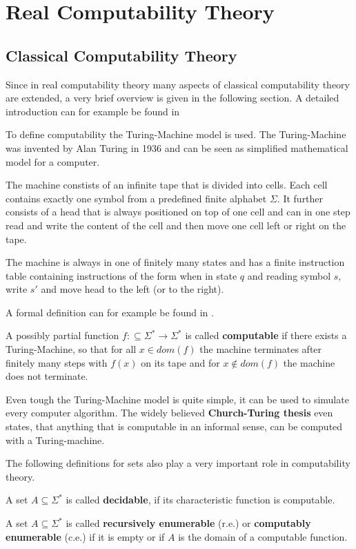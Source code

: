 \section{Real Computability Theory}\label{sec:real computability}
\subsection{Classical Computability Theory}
 Since in real computability theory many aspects of classical computability theory are extended, 
 a very brief overview is given in the following section. 
 A detailed introduction can for example be found in \cite{computability}

 To define computability the Turing-Machine model is used.
 The Turing-Machine was invented by Alan Turing in 1936 \cite{Turing} and can
 be seen as simplified mathematical model for a computer.

 The machine constists of an infinite tape that is divided into cells. 
 Each cell contains exactly one symbol from a predefined finite alphabet
 $\Sigma$.
 It further consists of a head that is always positioned on top of one cell 
 and can in one step read and write the content of the cell and then move one
 cell left or right on the tape.

 The machine is always in one of finitely many states and has a finite
 instruction table containing instructions of the form when in state $q$ and
 reading symbol $s$, write $s'$ and move head to the left (or to the right).

 A formal definition can for example be found in \cite{Hopmann}.
 
 \begin{definition}
 	A possibly partial function $f:\subseteq \Sigma^* \to \Sigma^*$ is called \textbf{computable} if there exists 
 	a Turing-Machine, so that for all $x \in dom(f)$ the machine terminates after finitely many steps with $f(x)$ on its 
 	tape and for $x \not \in dom(f)$ the machine does not terminate.
 \end{definition}

 Even tough the Turing-Machine model is quite simple, it can be used to
 simulate every computer algorithm.
 The widely believed \textbf{Church-Turing thesis} even states, that anything
 that is computable in an informal sense, can be computed with a
 Turing-machine.

 The following definitions for sets also play a very important role in
 computability theory.
  \begin{definition}
A set $A \subseteq \Sigma^*$ is called \textbf{decidable}, if its characteristic function is computable.
\end{definition}
\begin{definition}
A set $A \subseteq \Sigma^*$ is called \textbf{recursively enumerable} (r.e.) or \textbf{computably enumerable} (c.e.) if
it is empty or if $A$ is the domain of a computable function.
\end{definition}

